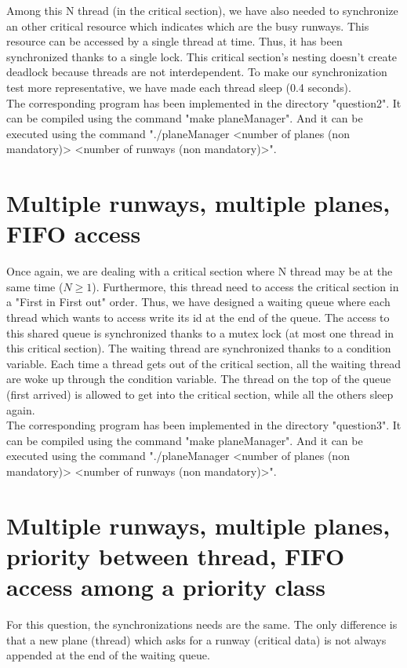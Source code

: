\documentclass[a4paper]{article}
\begin{document}
Among this N thread (in the critical section), we have also needed to synchronize an other critical resource which indicates which are the busy runways.  This resource can be accessed by a single thread at time.  Thus, it has been synchronized thanks to a single lock.  This critical section's nesting doesn't create deadlock because threads are not interdependent.   To make our synchronization test more representative, we have made each thread sleep (0.4 seconds).\\

The corresponding program has been implemented in the directory "question2".   It can be compiled using the command "make planeManager".   And it can be executed using the command "./planeManager <number of planes (non mandatory)> <number of runways (non mandatory)>".



\section{Multiple runways, multiple planes, FIFO access}
Once again, we are dealing with a critical section where N thread may be at the same time ($N \geq 1$).  Furthermore, this thread need to access the critical section in a "First in First out" order.   Thus, we have designed a waiting queue where each thread which wants to access write its id at the end of the queue.   The access to this shared queue is synchronized thanks to a mutex lock (at most one thread in this critical section).   The waiting thread are synchronized thanks to a condition variable.  Each time a thread gets out of the critical section, all the waiting thread are woke up through the condition variable.   The thread on the top of the queue (first arrived) is allowed to get into the critical section, while all the others sleep again.\\

The corresponding program has been implemented in the directory "question3".   It can be compiled using the command "make planeManager".   And it can be executed using the command "./planeManager <number of planes (non mandatory)> <number of runways (non mandatory)>".

\section{Multiple runways, multiple planes, priority between thread, FIFO access among a priority class}
For this question, the synchronizations needs are the same.   The only difference is that a new plane (thread) which asks for a runway (critical data) is not always appended at the end of the waiting queue.\\
\end{document}
